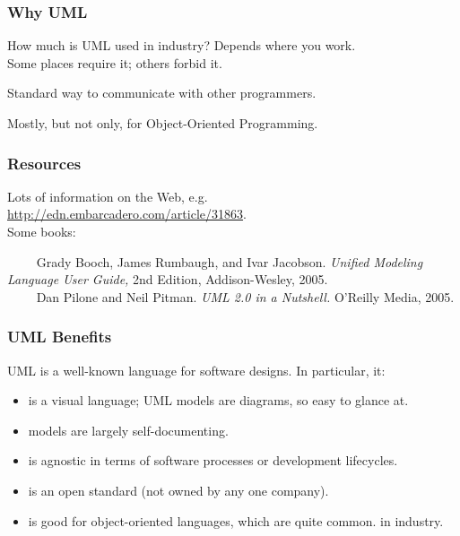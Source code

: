 \begin{frame}
\frametitle{Why UML}
\begin{changemargin}{1cm}
How much is UML used in industry? Depends where you work.\\
	\quad Some places require it; others forbid it.
	
Standard way to communicate with other programmers.

Mostly, but not only, for Object-Oriented Programming.

\end{changemargin}
\end{frame}



\begin{frame}
\frametitle{Resources}

\begin{changemargin}{1cm}

Lots of information on the Web, e.g. \\
\url{http://edn.embarcadero.com/article/31863}.\\[1em]

Some books:

$\qquad$ Grady Booch, James Rumbaugh, and Ivar Jacobson. \emph{Unified
Modeling Language User Guide,} 2nd Edition, Addison-Wesley, 2005.\\[0.5em]

$\qquad$ Dan Pilone and Neil Pitman. \emph{UML 2.0 in a Nutshell.} O'Reilly Media, 2005.

\end{changemargin}

\end{frame}


\begin{frame}
\frametitle{UML Benefits}

\begin{changemargin}{1cm}
\small
UML is a well-known
language for software designs. In particular, it:

\begin{itemize}
\item is a visual language; UML models are diagrams, so easy
to glance at.
\item models are largely self-documenting.
\item is agnostic in terms of software processes or development lifecycles.
\item is an open standard (not owned by any one company).
\item is good for object-oriented languages, which are quite common.
in industry.
\end{itemize}
\end{changemargin}
\end{frame}

